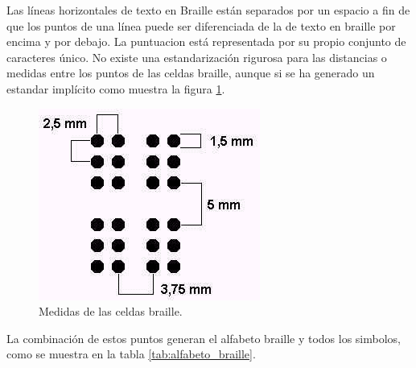 Las l\'ineas horizontales de texto en Braille est\'an separados por un espacio
a fin de que los puntos de una l\'inea puede ser diferenciada de la de texto
en braille por encima y por debajo. La puntuacion est\'a representada por su
propio conjunto de caracteres \'unico. No existe una estandarizaci\'on
rigurosa para las distancias o medidas entre los puntos de las celdas braille,
aunque si se ha generado un estandar impl\'icito como muestra la figura
\ref{fig:distance_dots_braille}.


\begin{figure}[htp]
\centering
\includegraphics[scale=0.6]{./img/distance_dots_braille.png}
\caption{Medidas de las celdas braille.}
\label{fig:distance_dots_braille}
\end{figure}

La combinaci\'on de estos puntos generan el alfabeto braille y todos los
simbolos, como se muestra en la tabla \ref{tab:alfabeto_braille}.

